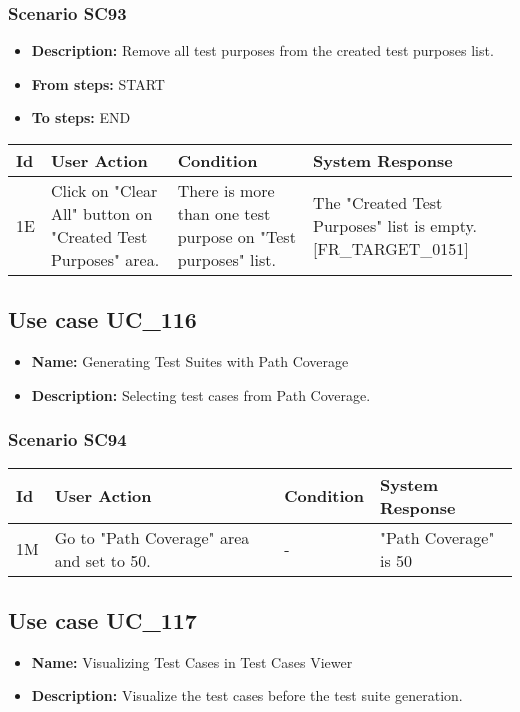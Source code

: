 \documentclass[a4paper,11pt]{article}
\newcommand{\bl}{\\ \hline}
\begin{document}
\subsubsection*{Scenario SC93}
\begin{itemize}
\item {\bf Description:} Remove all test purposes from the created test purposes
					list.
\item {\bf From steps:} START
\item {\bf To steps:} END
\end{itemize}
\begin{tabular}{|p{0.4in}|p{1.5in}|p{1.5in}|p{1.5in}|}
\hline
Id & User Action & Condition & System Response \bl 
1E & Click on "Clear All" button on "Created Test Purposes"
						area.  & There is more than one test purpose on "Test purposes"
						list. & The "Created Test Purposes" list is empty.
						[FR_TARGET_0151]\bl
\end{tabular}
\subsection*{Use case UC_116}
\begin{itemize}
\item {\bf Name: }Generating Test Suites with Path Coverage
\item {\bf Description: }Selecting test cases from Path Coverage.
\end{itemize}
\subsubsection*{Scenario SC94}
\begin{tabular}{|p{0.4in}|p{1.5in}|p{1.5in}|p{1.5in}|}
\hline
Id & User Action & Condition & System Response \bl 
1M & Go to "Path Coverage" area and set to 50.  & - & "Path Coverage" is 50%
\end{tabular}
\subsection*{Use case UC_117}
\begin{itemize}
\item {\bf Name: }Visualizing Test Cases in Test Cases Viewer
\item {\bf Description: }Visualize the test cases before the test suite
				generation.
\end{itemize}
\end{document}
